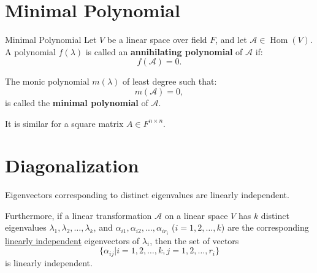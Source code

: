 \documentclass[11pt]{../../TexTemplate/elegantbook} %
\begin{document}
\section{Minimal Polynomial}
\begin{definition}{Minimal Polynomial}
    Let \( V \) be a linear space over field \( F \), 
    and let \( \mathcal{A}\in \operatorname{Hom}(V) \).
    A polynomial \( f(\lambda) \) is called an \textbf{annihilating polynomial} of \( \mathcal{A} \) if:
    \[
    f(\mathcal{A}) = 0.
    \]

    The monic polynomial \( m(\lambda) \) of least degree such that:
    \[
    m(\mathcal{A}) = 0,
    \]
    is called the \textbf{minimal polynomial} of \( \mathcal{A} \).

    It is similar for a square matrix \( A \in F^{n \times n} \).
\end{definition}


\section{Diagonalization}
\begin{lemma}
    Eigenvectors corresponding to distinct eigenvalues are linearly independent.

    Furthermore, if a linear transformation \( \mathcal{A} \) on a linear space \( V \)
    has \( k \) distinct eigenvalues \( \lambda_1, \lambda_2, \dots, \lambda_k \),
    and \( \alpha_{i1}, \alpha_{i2}, \dots, \alpha_{ir_{i}} \) (\(i = 1, 2, \dots, k\)) 
    are the corresponding \underline{linearly independent} eigenvectors of \( \lambda_i \),
    then the set of vectors
    \[
    \{ \alpha_{ij} | i = 1, 2, \dots, k, j = 1, 2, \dots, r_i \}
    \]
    is linearly independent.
\end{lemma}
\end{document}
